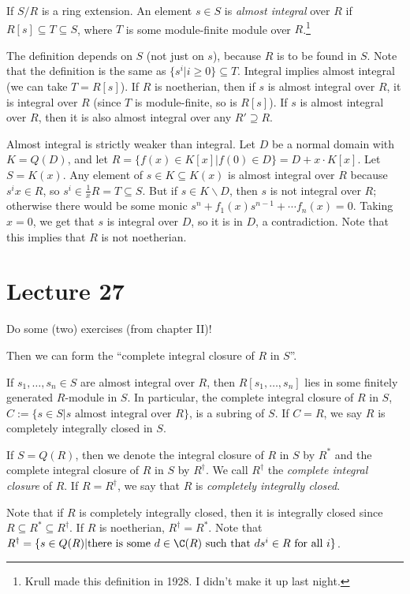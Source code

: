  \begin{definition}
   If $S/R$ is a ring extension. An element $s\in S$ is \emph{almost integral} over $R$
   if $R[s]\subseteq T\subseteq S$, where $T$ is some module-finite module over
   $R$.\footnote{Krull made this definition in 1928. I didn't make it up last night.}
 \end{definition}
 \begin{remark}
   The definition depends on $S$ (not just on $s$), because $R$ is to be found in $S$.
   Note that the definition is the same as $\{s^i|i\ge 0\}\subseteq T$. Integral implies
   almost integral (we can take $T=R[s]$). If $R$ is noetherian, then if $s$ is almost
   integral over $R$, it is integral over $R$ (since $T$ is module-finite, so is $R[s]$).
   If $s$ is almost integral over $R$, then it is also almost integral over any
   $R'\supseteq R$.
 \end{remark}
 \begin{example}[$D+(x)$ construction] Almost integral is strictly weaker than integral.
  Let $D$ be a normal domain with $K=Q(D)$, and let $R=\{f(x)\in K[x]|f(0)\in D\} =
  D+x\cdot K[x]$. Let $S=K(x)$. Any element of $s\in K\subseteq K(x)$ is almost integral
  over $R$ because $s^i x\in R$, so $s^i\in \frac{1}{x}R = T\subseteq S$. But if $s\in
  K\smallsetminus D$, then $s$ is not integral over $R$; otherwise there would be some
  monic $s^n+f_1(x)s^{n-1}+\cdots f_n(x)=0$. Taking $x=0$, we get that $s$ is integral
  over $D$, so it is in $D$, a contradiction. Note that this implies that $R$ is not
  noetherian.
 \end{example}
 \setcounter{lecture}{27}
 \section{Lecture 27}

 Do some (two) exercises (from chapter II)!

 Then we can form the ``complete integral closure of $R$ in $S$''.
 \begin{proposition}
   If $s_1,\dots, s_n\in S$ are almost integral over $R$, then $R[s_1,\dots, s_n]$ lies
   in some finitely generated $R$-module in $S$. In particular, the complete integral
   closure of $R$ in $S$, $C:=\{s\in S| s\text{ almost integral over }R\}$, is a subring
   of $S$. If $C=R$, we say $R$ is completely integrally closed in $S$.
 \end{proposition}
 \begin{definition}
   If $S=Q(R)$, then we denote the integral closure of $R$ in $S$ by $R^*$ and the
   complete integral closure of $R$ in $S$ by $R^\dag$. We call $R^\dag$ the
   \emph{complete integral closure} of $R$. If $R=R^\dag$, we say that $R$ is
   \emph{completely integrally closed}.
 \end{definition}
 \begin{remark}
   Note that if $R$ is completely integrally closed, then it is integrally closed since
   $R\subseteq R^*\subseteq R^\dag$. If $R$ is noetherian, $R^\dag=R^*$. Note that
   $R^\dag=\{s\in Q(R)|\text{there is some }d\in \C(R) \text{ such that }ds^i\in R\text{
   for all }i\}$.
 \end{remark}

